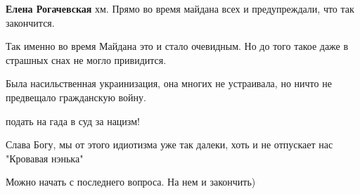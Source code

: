 \begin{itemize}
\begin{itemize}
 
\textbf{Елена Рогачевская} хм. Прямо во время майдана всех и предупреждали, что так закончится.

 

Так именно во время Майдана это и стало очевидным. Но до того такое даже в
страшных снах не могло привидится.

Была насильственная украинизация, она многих не устраивала, но ничто не
предвещало гражданскую войну.

\end{itemize}

 
подать на гада в суд за нацизм!

 
Слава Богу, мы от этого идиотизма уже так далеки, хоть и не отпускает нас "Кровавая нэнька"

 
Можно начать с последнего вопроса.
На нем и закончить)

 

\end{itemize}
